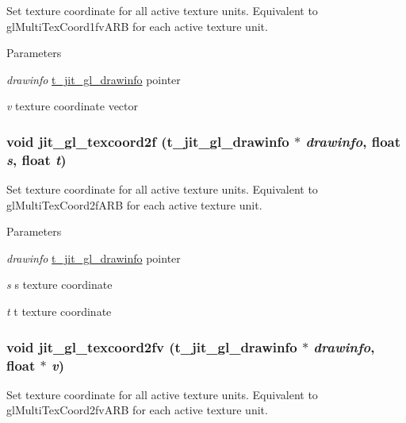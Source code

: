 Set texture coordinate for all active texture units. Equivalent to glMultiTexCoord1fvARB for each active texture unit.


\begin{DoxyParams}{Parameters}
\item[{\em drawinfo}]\hyperlink{structt__jit__gl__drawinfo}{t\_\-jit\_\-gl\_\-drawinfo} pointer \item[{\em v}]texture coordinate vector \end{DoxyParams}
\hypertarget{group__ob3dmod_ga9d8dcc769098328f5177525fbc60c400}{
\subsubsection[{jit\_\-gl\_\-texcoord2f}]{\setlength{\rightskip}{0pt plus 5cm}void jit\_\-gl\_\-texcoord2f ({\bf t\_\-jit\_\-gl\_\-drawinfo} $\ast$ {\em drawinfo}, \/  float {\em s}, \/  float {\em t})}}
\label{group__ob3dmod_ga9d8dcc769098328f5177525fbc60c400}


Set texture coordinate for all active texture units. Equivalent to glMultiTexCoord2fARB for each active texture unit.


\begin{DoxyParams}{Parameters}
\item[{\em drawinfo}]\hyperlink{structt__jit__gl__drawinfo}{t\_\-jit\_\-gl\_\-drawinfo} pointer \item[{\em s}]s texture coordinate \item[{\em t}]t texture coordinate \end{DoxyParams}
\hypertarget{group__ob3dmod_ga48fbe64a3a032f487c509f23d1b6e9ea}{
\subsubsection[{jit\_\-gl\_\-texcoord2fv}]{\setlength{\rightskip}{0pt plus 5cm}void jit\_\-gl\_\-texcoord2fv ({\bf t\_\-jit\_\-gl\_\-drawinfo} $\ast$ {\em drawinfo}, \/  float $\ast$ {\em v})}}
\label{group__ob3dmod_ga48fbe64a3a032f487c509f23d1b6e9ea}


Set texture coordinate for all active texture units. Equivalent to glMultiTexCoord2fvARB for each active texture unit.


